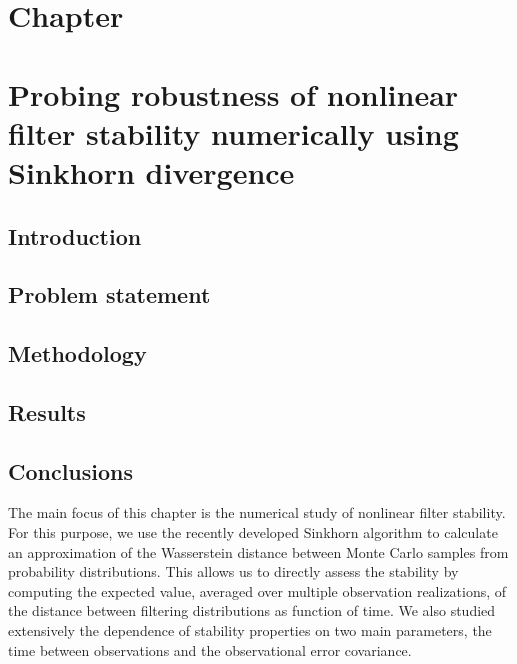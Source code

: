 \chapter*{Chapter }
\textit{}
\newpage

\chapter{Probing robustness of nonlinear filter stability numerically using Sinkhorn divergence}
\section{Introduction}\label{sec-intro--probing-nfs}


\section{Problem statement}\label{sec-problem--probing-nfs}


\section{Methodology}\label{sec-method--probing-nfs}




\section{Results}\label{sec-results--probing-nfs}


\section{Conclusions}\label{sec-conclude--probing-nfs}

The main focus of this chapter is the numerical study of nonlinear filter stability. For this purpose, we use the recently developed Sinkhorn algorithm to calculate an approximation of the Wasserstein distance between Monte Carlo samples from probability distributions. This allows us to directly assess the stability by computing the expected value, averaged over multiple observation realizations, of the distance between filtering distributions as function of time. We also studied extensively the dependence of stability properties on two main parameters, the time between observations and the observational error covariance. 

